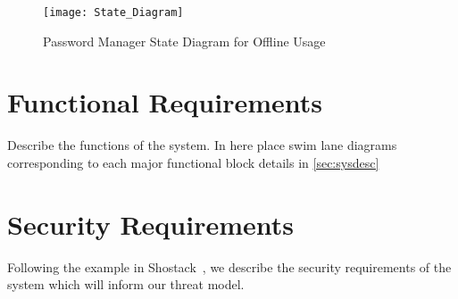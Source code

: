 \begin{figure}[h]
    \centering
    \texttt{[image: State\_Diagram]}
    \caption{Password Manager State Diagram for Offline Usage}
    \label{fig:state_diagram}
\end{figure}

\section{Functional Requirements}
\label{sec:funcreq}
Describe the functions of the system.  In here place swim lane diagrams corresponding to each major functional block details in \ref{sec:sysdesc}

\section{Security Requirements}
\label{sec:secreqs}
Following the example in Shostack~\cite{shostackbook}, we describe the security requirements of the system which will inform our threat model.
